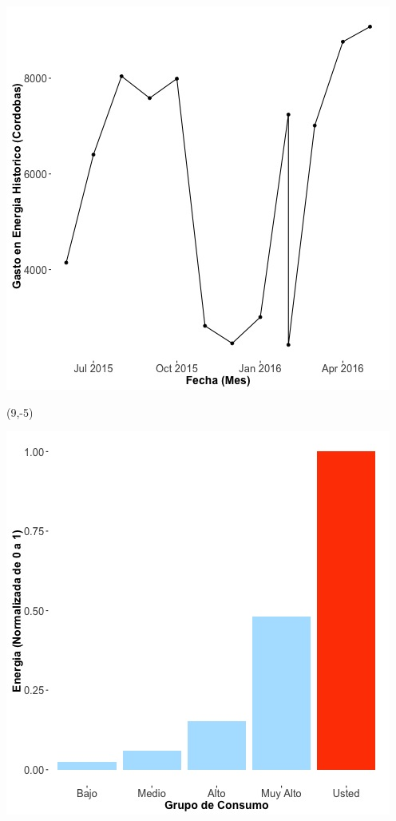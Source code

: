 \documentclass{article}\usepackage[]{graphicx}\usepackage[]{color}
\newenvironment{knitrout}{}{} %
\begin{document}
\begin{knitrout}
\color{fgcolor}
\includegraphics[scale=0.65]{figure/A11_historico_cordobas} 
\end{knitrout}

 \begin{textblock}{1}(9,-5)
\begin{minipage}{20em}
\begingroup

\endgroup
\end{minipage}
\end{textblock}


\begin{knitrout}
\color{fgcolor}
\includegraphics[scale=0.65]{figure/A11_neighbor_plot} 
\end{knitrout}
\end{document}
